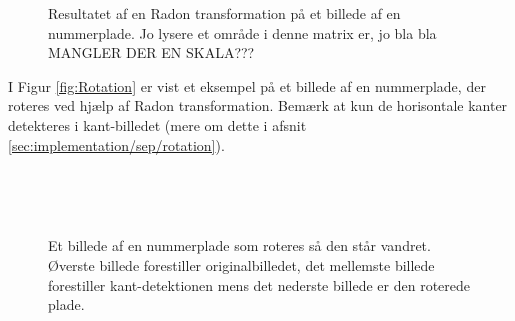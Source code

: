 \begin{figure}[htp]
  \centering
  \caption{Resultatet af en Radon transformation på et billede af en nummerplade. Jo lysere et område i denne matrix er, jo bla bla MANGLER DER EN SKALA???}
  \label{fig:radon_matrix}
\end{figure}

I Figur \vref{fig:Rotation} er vist et eksempel på et billede af en nummerplade, der roteres ved hjælp af Radon transformation. Bemærk at kun de horisontale kanter detekteres i kant-billedet (mere om dette i afsnit \vref{sec:implementation/sep/rotation}).

\begin{figure}[htp]
  \centering
  \begin{minipage}[c]{6 cm}
  \end{minipage}\\
  \begin{minipage}[c]{6 cm}
  \end{minipage}\\
  \begin{minipage}[c]{6 cm}
  \end{minipage}
  \caption{Et billede af en nummerplade som roteres så den står vandret. Øverste billede forestiller originalbilledet, det mellemste billede forestiller kant-detektionen mens det nederste billede er den roterede plade.}
  \label{fig:Rotation}
\end{figure}


